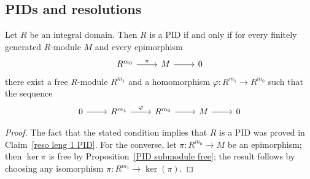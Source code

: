 \subsection{PIDs and resolutions}
\begin{proposition}\label{resolution length 1 iff PID}
Let $R$ be an integral domain. Then $R$ is a PID if and only if for every finitely generated $R$-module $M$ and every epimorphism
\[\begin{tikzcd}
R^{m_0}\ar[r,"\pi"]&M\ar[r]&0
\end{tikzcd}\]
there exist a free $R$-module $R^{m_1}$ and a homomorphism $\varphi:R^{m_1}\to R^{m_0}$ such that the sequence
\[\begin{tikzcd}
0\ar[r]&R^{m_1}\ar[r,"\varphi"]&R^{m_0}\ar[r]&M\ar[r]&0
\end{tikzcd}\]
\end{proposition}
\begin{proof}
The fact that the stated condition implies that $R$ is a PID was proved in Claim~\ref{reso leng 1 PID}. For the converse, let $\pi:R^{m_0}\to M$ be an epimorphism; then $\ker\pi$ is free by Proposition~\ref{PID submodule free}; the result follows by choosing any isomorphism $\pi:R^{m_1}\to\ker(\pi)$.
\end{proof}
